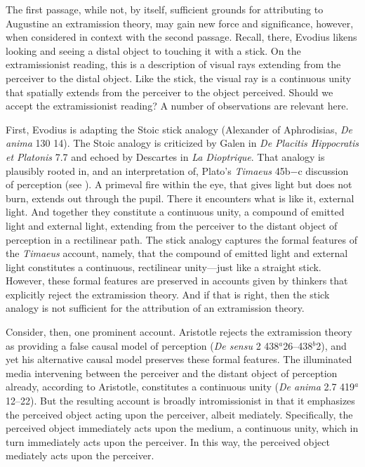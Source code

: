 \documentclass[12pt]{article}
\begin{document}
The first passage, while not, by itself, sufficient grounds for attributing to Augustine an extramission theory, may gain new force and significance, however, when considered in context with the second passage. Recall, there, Evodius likens looking and seeing a distal object to touching it with a stick. On the extramissionist reading, this is a description of visual rays extending from the perceiver to the distal object. Like the stick, the visual ray is a continuous unity that spatially extends from the perceiver to the object perceived. Should we accept the extramissionist reading? A number of observations are relevant here.

First, Evodius is adapting the Stoic stick analogy (Alexander of Aphrodisias, \emph{De anima} 130 14).  The Stoic analogy is criticized by Galen in \emph{De Placitis Hippocratis et Platonis} 7.7 and echoed by Descartes in \emph{La Dioptrique}. That analogy is plausibly rooted in, and an interpretation of, Plato's \emph{Timaeus} 45b−c discussion of perception (see \citealt[chapter one]{Lindberg:1977aa}). A primeval fire within the eye, that gives light but does not burn, extends out through the pupil. There it encounters what is like it, external light. And together they constitute a continuous unity, a compound of emitted light and external light, extending from the perceiver to the distant object of perception in a rectilinear path. The stick analogy captures the formal features of the \emph{Timaeus} account, namely, that the compound of emitted light and external light constitutes a continuous, rectilinear unity---just like a straight stick. However, these formal features are preserved in accounts given by thinkers that explicitly reject the extramission theory. And if that is right, then the stick analogy is not sufficient for the attribution of an extramission theory. 

Consider, then, one prominent account. Aristotle rejects the extramission theory as providing a false causal model of perception (\emph{De sensu} 2 438\( ^{a} \)26--438\( ^{b} \)2), and yet his alternative causal model preserves these formal features. The illuminated media intervening between the perceiver and the distant object of perception already, according to Aristotle, constitutes a continuous unity (\emph{De anima} 2.7 419\( ^{a} \)12--22). But the resulting account is broadly intromissionist in that it emphasizes the perceived object acting upon the perceiver, albeit mediately. Specifically, the perceived object immediately acts upon the medium, a continuous unity, which in turn immediately acts upon the perceiver. In this way, the perceived object mediately acts upon the perceiver. 
\end{document}
